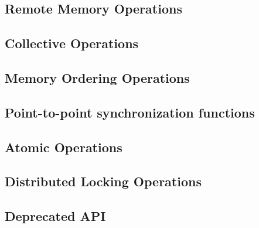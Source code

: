\documentclass[10pt]{book}
\begin{document}
\subsection{Remote Memory Operations}

\subsection{Collective Operations}

\subsection{Memory Ordering Operations} %
\subsection{Point-to-point synchronization functions}%
\subsection{Atomic Operations}

\subsection{Distributed Locking Operations}
\subsection{Deprecated API}
\end{document}
